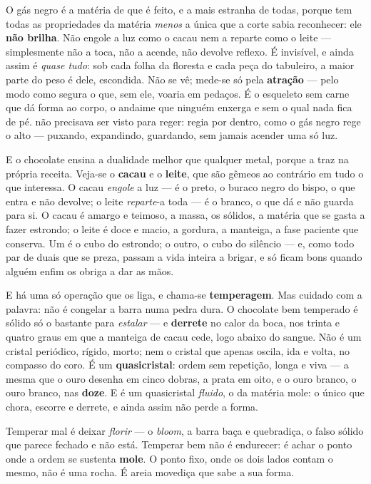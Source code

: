 \documentclass[livro.tex]{subfiles}
\begin{document}
\medskip

O gás negro é a matéria de que \Ven é feito, e a mais estranha de todas, porque tem
todas as propriedades da matéria \emph{menos} a única que a corte sabia reconhecer: ele
\textbf{não brilha}. Não engole a luz como o cacau nem a reparte como o leite ---
simplesmente não a toca, não a acende, não devolve reflexo. É invisível, e ainda assim é
\emph{quase tudo}: sob cada folha da floresta e cada peça do tabuleiro, a maior parte do
peso é dele, escondida. Não se vê; mede-se só pela \textbf{atração} --- pelo modo como
segura o que, sem ele, voaria em pedaços. É o esqueleto sem carne que dá forma ao corpo,
o andaime que ninguém enxerga e sem o qual nada fica de pé. \Ven não precisava ser visto
para reger: regia por dentro, como o gás negro rege o alto --- puxando, expandindo,
guardando, sem jamais acender uma só luz.

\medskip

E o chocolate ensina a dualidade melhor que qualquer metal, porque a traz na própria
receita. Veja-se o \textbf{cacau} e o \textbf{leite}, que são gêmeos ao contrário em
tudo o que interessa. O cacau \emph{engole} a luz --- é o preto, o buraco negro do
bispo, o que entra e não devolve; o leite \emph{reparte}-a toda --- é o branco, o que
dá e não guarda para si. O cacau é amargo e teimoso, a massa, os sólidos, a matéria
que se gasta a fazer estrondo; o leite é doce e macio, a gordura, a manteiga, a fase
paciente que conserva. Um é o cubo do estrondo; o outro, o cubo do
silêncio --- e, como todo par de duais que se preza, passam a vida
inteira a brigar, e só ficam bons quando alguém enfim os obriga a dar as mãos.

E há uma só operação que os liga, e chama-se \textbf{temperagem}. Mas cuidado com a
palavra: não é congelar a barra numa pedra dura. O chocolate bem temperado é sólido
só o bastante para \emph{estalar} --- e \textbf{derrete} no calor da boca, nos trinta
e quatro graus em que a manteiga de cacau cede, logo abaixo do sangue. Não é um
cristal periódico, rígido, morto; nem o cristal que apenas oscila, ida e volta, no
compasso do coro. É um \textbf{quasicristal}: ordem sem repetição, longa e viva --- a
mesma que o ouro desenha em cinco dobras, a prata em oito, e o ouro branco,
o ouro branco, nas \textbf{doze}. E é um quasicristal \emph{fluido}, o da matéria mole: o
único que chora, escorre e derrete, e ainda assim não perde a forma.

Temperar mal é deixar \emph{florir} --- o \emph{bloom}, a barra baça e quebradiça, o
falso sólido que parece fechado e não está. Temperar bem não é endurecer: é achar o
ponto onde a ordem se sustenta \textbf{mole}. O ponto fixo, onde os dois lados contam o mesmo, não é uma
rocha. É areia movediça que sabe a sua forma.
\end{document}
